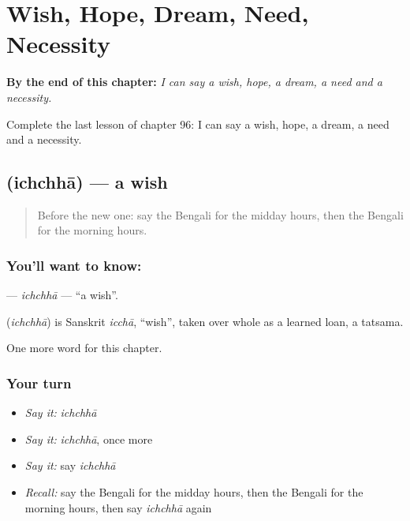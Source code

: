 
\chapter{Wish, Hope, Dream, Need, Necessity}
\label{ch:bn-wish-hope-dream-need-necessity}

\begin{chapteropening}
\textbf{By the end of this chapter:} \emph{I can say a wish, hope, a dream, a need and a necessity.}

Complete the last lesson of chapter 96: I can say a wish, hope, a dream, a need and a necessity.
\end{chapteropening}

\section[\texorpdfstring{\bn{ইচ্ছা} (ichchhā)}{ইচ্ছা (ichchhā)}]{ (ichchhā) — a wish}

\label{lesson:BN-C96-ichchha}



\begin{quote}
Before the new one: say the Bengali for the midday hours, then the Bengali for the morning hours.
\end{quote}

\subsection*{You'll want to know: }
\textbf{} — \emph{ichchhā} — \textquotedblleft{}a wish\textquotedblright{}.

\begin{cousinweb}
\textbf{} (\emph{ichchhā}) is Sanskrit \emph{icchā}, \textquotedblleft{}wish\textquotedblright{}, taken over whole as a learned loan, a tatsama.
\end{cousinweb}

\begin{grammarlens}[title={What you've built}]
One more word for this chapter.
\end{grammarlens}

\subsection*{Your turn}
\begin{itemize}
\raggedright
  \item \emph{Say it:} \emph{ichchhā}
  \item \emph{Say it:} \emph{ichchhā}, once more
  \item \emph{Say it:} say \emph{ichchhā}
  \item \emph{Recall:} say the Bengali for the midday hours, then the Bengali for the morning hours, then say \emph{ichchhā} again
\end{itemize}

